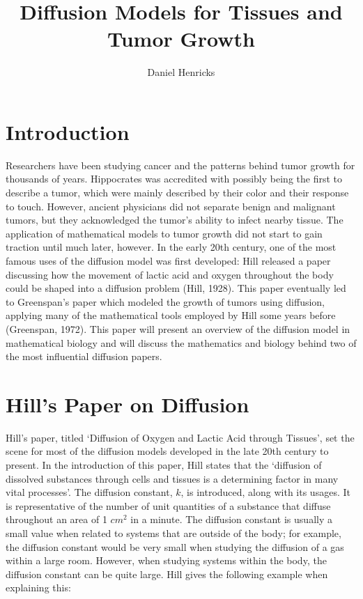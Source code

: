 \documentclass{article}
\title{Diffusion Models for Tissues and Tumor Growth}
\author{Daniel Henricks}
\begin{document}
\maketitle

\section{Introduction}

Researchers have been studying cancer and the patterns behind tumor growth for thousands of years. Hippocrates
was accredited with possibly being the first to describe a tumor, which were mainly described by their color
and their response to touch. However, ancient physicians did not separate benign and malignant tumors, but they
acknowledged the tumor's ability to infect nearby tissue. The application of mathematical models to tumor growth
did not start to gain traction until much later, however. In the early 20th century, one of the most famous uses of
the diffusion model was first developed: Hill released a paper discussing how the movement of lactic acid
and oxygen throughout the body could be shaped into a diffusion problem (Hill, 1928). This paper eventually led to
Greenspan's paper which modeled the growth of tumors using diffusion, applying many of the mathematical tools employed
by Hill some years before (Greenspan, 1972). This paper will present an overview of the diffusion model in mathematical
biology and will discuss the mathematics and biology behind two of the most influential diffusion papers.

\section{Hill's Paper on Diffusion}

Hill's paper, titled `Diffusion of Oxygen and Lactic Acid through Tissues', set the scene for most of the diffusion models
developed in the late 20th century to present. In the introduction of this paper, Hill states that the
`diffusion of dissolved substances through cells and tissues is a determining factor in many vital processes'.
The diffusion constant, $k$, is introduced, along with its usages. It is representative of the number of unit quantities
of a substance that diffuse throughout an area of 1 $cm^2$ in a minute. The diffusion constant is usually a small value
when related to systems that are outside of the body; for example, the diffusion constant would be very small when studying
the diffusion of a gas within a large room. However, when studying systems within the body, the diffusion constant can be quite large.
Hill gives the following example when explaining this:
\end{document}
